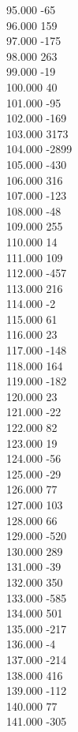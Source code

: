 { 95.000	-65 \\
 96.000	159 \\
 97.000	-175 \\
 98.000	263 \\
 99.000	-19 \\
 100.000	40 \\
 101.000	-95 \\
 102.000	-169 \\
 103.000	3173 \\
 104.000	-2899 \\
 105.000	-430 \\
 106.000	316 \\
 107.000	-123 \\
 108.000	-48 \\
 109.000	255 \\
 110.000	14 \\
 111.000	109 \\
 112.000	-457 \\
 113.000	216 \\
 114.000	-2 \\
 115.000	61 \\
 116.000	23 \\
 117.000	-148 \\
 118.000	164 \\
 119.000	-182 \\
 120.000	23 \\
 121.000	-22 \\
 122.000	82 \\
 123.000	19 \\
 124.000	-56 \\
 125.000	-29 \\
 126.000	77 \\
 127.000	103 \\
 128.000	66 \\
 129.000	-520 \\
 130.000	289 \\
 131.000	-39 \\
 132.000	350 \\
 133.000	-585 \\
 134.000	501 \\
 135.000	-217 \\
 136.000	-4 \\
 137.000	-214 \\
 138.000	416 \\
 139.000	-112 \\
 140.000	77 \\
 141.000	-305 \\
}
